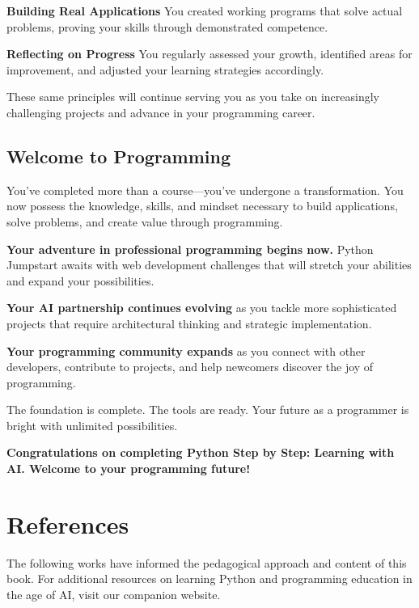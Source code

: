 \documentclass[
  letterpaper,
  DIV=11,
  numbers=noendperiod,
  oneside]{scrreprt}
\newlength{\cslhangindent}
\newenvironment{CSLReferences}[2] %
 {\begin{list}{}{%
  \setlength{\itemindent}{0pt}
  \setlength{\leftmargin}{0pt}
  \setlength{\parsep}{0pt}
  \ifodd #1
   \setlength{\leftmargin}{\cslhangindent}
   \setlength{\itemindent}{-1\cslhangindent}
  \fi
  \setlength{\itemsep}{#2\baselineskip}}}
 {\end{list}}
\begin{document}
\textbf{Building Real Applications} You created working programs that
solve actual problems, proving your skills through demonstrated
competence.

\textbf{Reflecting on Progress} You regularly assessed your growth,
identified areas for improvement, and adjusted your learning strategies
accordingly.

These same principles will continue serving you as you take on
increasingly challenging projects and advance in your programming
career.

\section{Welcome to Programming}\label{welcome-to-programming}

You've completed more than a course---you've undergone a transformation.
You now possess the knowledge, skills, and mindset necessary to build
applications, solve problems, and create value through programming.

\textbf{Your adventure in professional programming begins now.} Python
Jumpstart awaits with web development challenges that will stretch your
abilities and expand your possibilities.

\textbf{Your AI partnership continues evolving} as you tackle more
sophisticated projects that require architectural thinking and strategic
implementation.

\textbf{Your programming community expands} as you connect with other
developers, contribute to projects, and help newcomers discover the joy
of programming.

The foundation is complete. The tools are ready. Your future as a
programmer is bright with unlimited possibilities.

\textbf{Congratulations on completing Python Step by Step: Learning with
AI. Welcome to your programming future! 🚀}


\chapter*{References}\label{references}


The following works have informed the pedagogical approach and content
of this book. For additional resources on learning Python and
programming education in the age of AI, visit our companion website.

\label{refs}
\begin{CSLReferences}{0}{1}
\end{CSLReferences}
\end{document}

